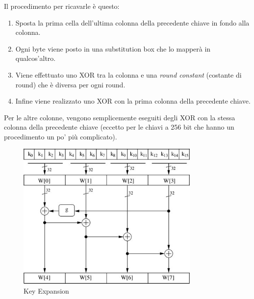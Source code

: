 \textsf{\small Il procedimento per ricavarle è questo: }

\begin{enumerate}
	\item \textsf{\small Sposta la prima cella dell'ultima colonna della precedente chiave in fondo alla colonna.} %
	\item \textsf{\small Ogni byte viene posto in una substitution box che lo mapperà in qualcos'altro.} %
	\item \textsf{\small Viene effettuato uno XOR tra la colonna e una \emph{round constant} (costante di round) che è diversa per ogni round.} %
	\item \textsf{\small Infine viene realizzato uno XOR con la prima colonna della precedente chiave.}
\end{enumerate}

\textsf{\small Per le altre colonne, vengono semplicemente eseguiti degli XOR con la stessa colonna della precedente chiave (eccetto per le chiavi a 256 bit che hanno un procedimento un po' più complicato).} \\ %

\begin{figure}[H] %
	\centering
	\includegraphics[width=0.8\textwidth, height=0.8\textheight, keepaspectratio]{./images/key_expansion/key_expansion.png}
	\caption{Key Expansion}
	\label{fig:key_expansion}
\end{figure}

